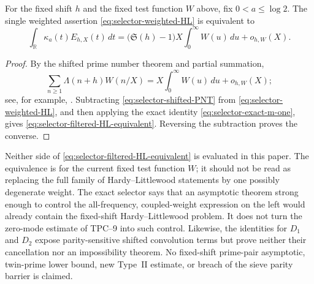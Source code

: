 \begin{corollary}
\label{cor:selector-HL-equivalence}
For the fixed shift $h$ and the fixed test function $W$ above, fix
$0<a\leq\log2$.  The single weighted assertion
\eqref{eq:selector-weighted-HL} is equivalent to
\begin{equation}
 \int_{\mathbb R}\kappa_a(t)E_{h,X}(t)\,dt
 =\bigl(\mathfrak S(h)-1\bigr)X
   \int_0^\infty W(u)\,du+o_{h,W}(X).
 \label{eq:selector-filtered-HL-equivalent}
\end{equation}
\end{corollary}

\begin{proof}
By the shifted prime number theorem and partial summation,
\begin{equation}
 \sum_{n\geq1}\Lambda(n+h)W(n/X)
 =X\int_0^\infty W(u)\,du+o_{h,W}(X);
 \label{eq:selector-shifted-PNT}
\end{equation}
see, for example, \citet{IwaniecKowalski2004}.  Subtracting
\eqref{eq:selector-shifted-PNT} from
\eqref{eq:selector-weighted-HL}, and then applying the exact identity
\eqref{eq:selector-exact-m-one}, gives
\eqref{eq:selector-filtered-HL-equivalent}.  Reversing the subtraction
proves the converse.
\end{proof}

\begin{remark}
\label{rem:selector-strict-boundary}
Neither side of \eqref{eq:selector-filtered-HL-equivalent} is evaluated in
this paper.  The equivalence is for the current fixed test function $W$;
it should not be read as replacing the full family of Hardy--Littlewood
statements by one possibly degenerate weight.  The exact selector says that
an asymptotic theorem strong
enough to control the all-frequency, coupled-weight expression on the left
would already contain the fixed-shift Hardy--Littlewood problem.  It does
not turn the zero-mode estimate of TPC--9 into such control.  Likewise, the
identities for $D_1$ and $D_2$ expose parity-sensitive shifted convolution
terms but prove neither their cancellation nor an impossibility theorem.
No fixed-shift prime-pair asymptotic, twin-prime lower bound, new Type~II
estimate, or breach of the sieve parity barrier is claimed.
\end{remark}
